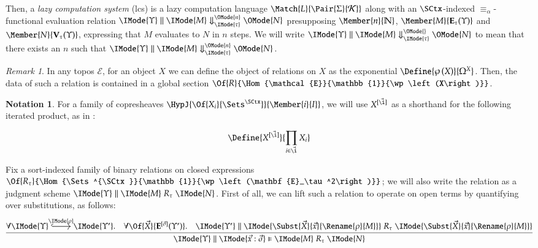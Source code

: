 \documentclass[11pt]{article}
\theoremstyle{definition}
\theoremstyle{notation}
\newtheorem*{notation*}{Notation}
\theoremstyle{remark}
\newtheorem{remark}[thm]{Remark}
\numberwithin{equation}{section}
\newcommand\Pow[1]{\wp\left(#1\right)}
\newcommand\CanOperators{\mathcal{K}}
\newcommand\EvalN[5]{\IMode{#1}\parallel\IMode{#4}\Downarrow^{\OMode{#3}}_{\IMode{#2}}\OMode{#5}}
\newcommand\Eval[4]{\EvalN{#1}{#2}{}{#3}{#4}}
\newcommand\Exprs{\mathbf{E}}
\newcommand\Values{\mathbf{V}}
\newcommand\Naturals{\mathbb{N}}
\begin{document}
Then, a \emph{lazy computation system} (lcs) is a lazy computation language
$\Match{L}{\Pair{\Sigma}{\CanOperators}}$ along with an $\SCtx$-indexed
$\equiv_\alpha$-functional evaluation relation
$\EvalN{\Upsilon}{\tau}{n}{M}{N}$ presupposing $\Member{n}{\Naturals}$,
$\Member{M}{\Exprs_\tau(\Upsilon)}$ and $\Member{N}{\Values_\tau(\Upsilon)}$,
expressing that $M$ evaluates to $N$ in $n$ steps.  We will write
$\Eval{\Upsilon}{\tau}{M}{N}$ to mean that there exists an $n$ such that
$\EvalN{\Upsilon}{\tau}{n}{M}{N}$.

\begin{remark}
  In any topos $\mathcal{E}$, for an object $X$ we can define the object of
  relations on $X$ as the exponential $\Define{\Pow{X}}{\Omega^X}$. Then, the
  data of such a relation is contained in a global section
  $\Of{R}{\Hom{\mathcal{E}}{\mathbb{1}}{\Pow{X}}}$.
\end{remark}

\newcommand\SBinRel[4]{\IMode{#2}\parallel\IMode{#3}\mathrel{#1}\IMode{#4}}
\newcommand\OSBinRel[5]{\IMode{#2}\parallel\IMode{#3}\vDash\IMode{#4}\mathrel{#1}\IMode{#5}}

\begin{notation*}
  For a family of copresheaves $\HypJ{\Of{X_i}{\Sets^\SCtx}}{\Member{i}{I}}$, we will
  use $X^{[\vec{\i}]}$ as a shorthand for the following iterated product, as
  in \cite{sterling-morrison:2015}:

  \[
    \Define{
      X^{[\vec{\i}]}
    }{
      \prod_{i\in\vec{\i}}
        X_i
    }
  \]
\end{notation*}

Fix a sort-indexed family of binary relations on closed expressions
$\Of{R_\tau}{\Hom{\Sets^{\SCtx}}{\mathbb{1}}{\Pow{\Exprs_\tau^2}}}$; we will
also write the relation as a judgment scheme
$\SBinRel{R_\tau}{\Upsilon}{M}{N}$. First of all, we can lift such a relation
to operate on open terms by quantifying over substitutions, as follows:
\[
  \infer{
    \OSBinRel{R_\tau}{\Upsilon}{\vec{x}:\vec{\sigma}}{M}{N}
  }{
    \forall
      \begin{tikzcd}[cramped, ampersand replacement = \&]
         \IMode{\Upsilon} \arrow[r,hook,"\IMode{\rho}"] \&\IMode{\Upsilon'}
      \end{tikzcd}.
    \quad
    \forall \Of{\vec{X}}{\Exprs^{[\vec{\sigma}]}(\Upsilon')}.
    \quad
    \SBinRel{R_\tau}{\Upsilon'}{
      \Subst{\vec{X}}{\vec{x}}{\Rename{\rho}{M}}
    }{
      \Subst{\vec{X}}{\vec{x}}{\Rename{\rho}{M}}
    }
  }
\]
\end{document}
